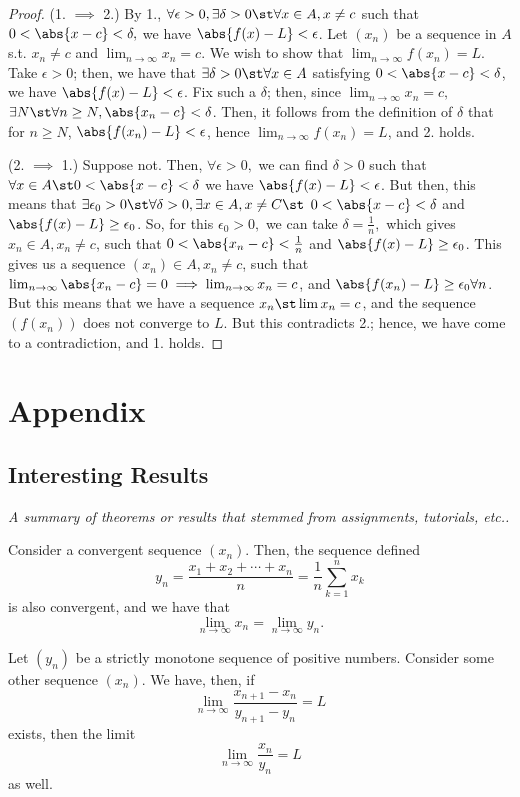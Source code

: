 \documentclass[12pt]{article}
\begin{document}
\begin{proof}
  (1. $\implies$ 2.) By 1., $\forall \epsilon > 0, \exists \delta > 0 \st \forall x \in A, x \neq c$ such that $0 < \abs{x - c} < \delta,$ we have $\abs{f(x) - L} < \epsilon$. Let $(x_n)$ be a sequence in $A$ s.t. $x_n \neq c$ and $\lim_{n\to\infty} x_n = c$. We wish to show that $\lim_{n\to\infty} f(x_n) = L$. Take $\epsilon > 0$; then, we have that $\exists \delta > 0 \st \forall x \in A$ satisfying $0 <\abs{x - c} < \delta$, we have $\abs{f(x) - L} < \epsilon$. Fix such a $\delta$; then, since $\lim_{n\to\infty} x_n = c,$ $\exists N \st \forall n \geq N, \abs{x_{n} - c} < \delta$. Then, it follows from the definition of $\delta$ that for $n \geq N$, $\abs{f(x_n) - L} < \epsilon$, hence $\lim_{n\to\infty} f(x_n) = L$, and 2. holds.

  (2. $\implies$ 1.) Suppose not. Then, $\forall \epsilon > 0,$ we can find $\delta > 0$ such that $\forall x \in A \st 0 < \abs{x - c} < \delta$ we have $\abs{f(x) - L} < \epsilon$. But then, this means that $\exists \epsilon_0 > 0 \st \forall \delta > 0, \exists x \in A, x \neq C \st$ $0 < \abs{x - c} < \delta$ and $\abs{f(x) - L} \geq \epsilon_0$. So, for this $\epsilon_0 >0,$ we can take $\delta = \frac{1}{n},$ which gives $x_n \in A, x_n \neq c$, such that $0 < \abs{x_n - c} < \frac{1}{n}$ and $\abs{f(x) - L} \geq \epsilon_0$. This gives us a sequence $(x_n) \in A, x_n \neq c$, such that $\lim_{n\to\infty} \abs{x_n - c} = 0 \implies \lim_{n\to\infty} x_n = c$,  and $\abs{f(x_n) - L} \geq \epsilon_0 \forall n$. But this means that we have a sequence $x_n \st \lim x_{n} = c$, and the sequence $(f(x_n))$ does not converge to $L$. But this contradicts 2.; hence, we have come to a contradiction, and 1. holds.
\end{proof}


\newpage
\section{Appendix}
\subsection{Interesting Results}
\textit{A summary of theorems or results that stemmed from assignments, tutorials, etc..}

\begin{theorem}
  Consider a convergent sequence $(x_n)$. Then, the sequence defined \[y_n = \frac{x_1 + x_2 + \cdots +x_n}{n} = \frac{1}{n} \sum_{k=1}^{n} x_k\] is also convergent, and we have that \[\lim_{n\to\infty} x_n = \lim_{n\to\infty} y_n.\]
\end{theorem}
\begin{theorem}
  Let $(y_n)$ be a strictly monotone sequence of positive numbers. Consider some other sequence $(x_n)$. We have, then, if \[\lim_{n\to\infty} \frac{x_{n+1}-x_n}{y_{n+1}-y_n} = L\] exists, then the limit \[\lim_{n\to\infty} \frac{x_n}{y_n} = L\] as well.
\end{theorem}
\end{document}
